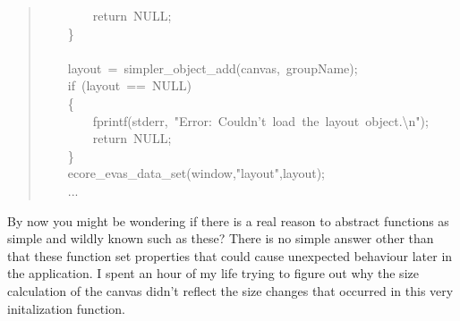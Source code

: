 \documentclass[12pt,a4paper,english]{book}
\begin{document}
\begin{quote}
{~~~~~~~~return~NULL;~\\
~~~~{\}}~\\
~\\
~~~~layout~=~simpler{\_}object{\_}add(canvas,~groupName);~\\
~~~~if~(layout~==~NULL)~\\
~~~~{\{}~\\
~~~~~~~~fprintf(stderr,~"Error:~Couldn't~load~the~layout~object.{\textbackslash}n");~\\
~~~~~~~~return~NULL;~\\
~~~~{\}}~\\
~~~~ecore{\_}evas{\_}data{\_}set(window,"layout",layout);~\\
~~~~...
}\end{quote}

By now you might be wondering if there is a real reason to abstract functions
as simple and wildly known such as these? There is no simple answer other than
that these function set properties that could cause unexpected behaviour later
in the application. I spent an hour of my life trying to figure out why the
size calculation of the canvas didn't reflect the size changes that occurred in
this very initalization function.
\end{document}
